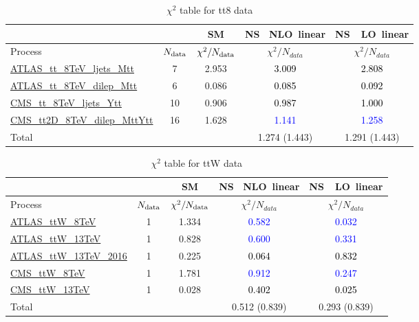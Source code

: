 \documentclass{article}
\begin{document}
\begin{table}[H]
\centering
\begin{tabular}{|l|c|c|c|c|}
\hline
 \multicolumn{2}{|c|}{} & SM& \rm NS \ NLO\ linear& \rm NS\ \ LO\ linear\\ \hline
Process & $N_{\rm data}$ & $\chi^ 2/N_{\rm data}$& $\chi^ 2/N_{data}$& $\chi^ 2/N_{data}$\\ \hline
\href{https://arxiv.org/abs/1511.04716}{ATLAS_tt_8TeV_ljets_Mtt} & 7 & 2.953 & \textcolor{black}                            {3.009} & \textcolor{black}                            {2.808} \\ \hline
\href{https://arxiv.org/abs/1607.07281}{ATLAS_tt_8TeV_dilep_Mtt} & 6 & 0.086 & \textcolor{black}                            {0.085} & \textcolor{black}                            {0.092} \\ \hline
\href{https://arxiv.org/abs/1505.04480}{CMS_tt_8TeV_ljets_Ytt} & 10 & 0.906 & \textcolor{black}                            {0.987} & \textcolor{black}                            {1.000} \\ \hline
\href{https://arxiv.org/abs/1703.01630}{CMS_tt2D_8TeV_dilep_MttYtt} & 16 & 1.628 & \textcolor{blue}                            {1.141} & \textcolor{blue}                            {1.258} \\ \hline
\hline Total & &  & 1.274 (1.443) & 1.291 (1.443) \\ \hline
\end{tabular}
\caption{$\chi^2$ table for tt8 data}
\end{table}
\begin{table}[H]
\centering
\begin{tabular}{|l|c|c|c|c|}
\hline
 \multicolumn{2}{|c|}{} & SM& \rm NS \ NLO\ linear& \rm NS\ \ LO\ linear\\ \hline
Process & $N_{\rm data}$ & $\chi^ 2/N_{\rm data}$& $\chi^ 2/N_{data}$& $\chi^ 2/N_{data}$\\ \hline
\href{https://arxiv.org/abs/1509.05276}{ATLAS_ttW_8TeV} & 1 & 1.334 & \textcolor{blue}                            {0.582} & \textcolor{blue}                            {0.032} \\ \hline
\href{https://arxiv.org/abs/1609.01599}{ATLAS_ttW_13TeV} & 1 & 0.828 & \textcolor{blue}                            {0.600} & \textcolor{blue}                            {0.331} \\ \hline
\href{https://arxiv.org/abs/1901.03584}{ATLAS_ttW_13TeV_2016} & 1 & 0.225 & \textcolor{black}                            {0.064} & \textcolor{black}                            {0.832} \\ \hline
\href{https://arxiv.org/abs/1510.01131}{CMS_ttW_8TeV} & 1 & 1.781 & \textcolor{blue}                            {0.912} & \textcolor{blue}                            {0.247} \\ \hline
\href{https://arxiv.org/abs/1711.02547}{CMS_ttW_13TeV} & 1 & 0.028 & \textcolor{black}                            {0.402} & \textcolor{black}                            {0.025} \\ \hline
\hline Total & &  & 0.512 (0.839) & 0.293 (0.839) \\ \hline
\end{tabular}
\caption{$\chi^2$ table for ttW data}
\end{table}
\end{document}
